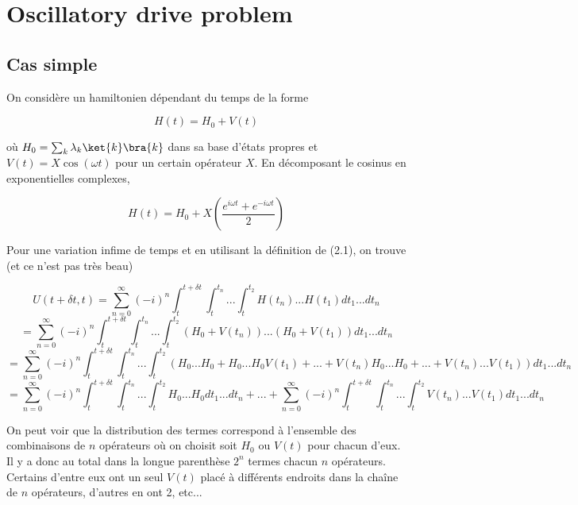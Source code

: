 \section{Oscillatory drive problem}
\subsection{Cas simple}
On considère un hamiltonien dépendant du temps de la forme 

\begin{equation}
    H(t) = H_0 + V(t)
\end{equation}

où $H_0 = \sum_{k} \lambda_k \ket{k}\bra{k}$ dans sa base d'états propres et $V(t) = X\cos(\omega t)$ pour un certain opérateur $X$. En décomposant le cosinus en exponentielles complexes, 

\begin{equation*}
    H(t) = H_0 + X\left(\frac{e^{i \omega t} + e^{-i\omega t}}{2}\right)
\end{equation*}

Pour une variation infime de temps et en utilisant la définition de (2.1), on trouve (et ce n'est pas très beau)

\begin{equation*}
    U(t+\delta t, t) = \sum_{n=0}^{\infty} (-i)^n \int_{t}^{t+\delta t}\int_{t}^{t_n}...\int_{t}^{t_2}H(t_n)...H(t_1)dt_1 ... dt_n
\end{equation*}
\begin{equation*}
    = \sum_{n=0}^{\infty} (-i)^n \int_{t}^{t+\delta t}\int_{t}^{t_n}...\int_{t}^{t_2}\left(H_0 + 
    V(t_n)\right)...\left(H_0 + V(t_1)\right)dt_1 ... dt_n
\end{equation*}
\begin{equation*}
    = \sum_{n=0}^{\infty} (-i)^n \int_{t}^{t+\delta t}\int_{t}^{t_n}...\int_{t}^{t_2} \left(H_0...H_0 + H_0...H_0V(t_1) + ... + V(t_n)H_0...H_0 + ... + V(t_n)...V(t_1)\right)dt_1 ... dt_n
\end{equation*}
\begin{equation}
    = \sum_{n=0}^{\infty} (-i)^n \int_{t}^{t+\delta t}\int_{t}^{t_n}...\int_{t}^{t_2} H_0...H_0 dt_1...dt_n + ... + \sum_{n=0}^{\infty} (-i)^n \int_{t}^{t+\delta t}\int_{t}^{t_n}...\int_{t}^{t_2} V(t_n)...V(t_1) dt_1...dt_n
\end{equation}

On peut voir que la distribution des termes correspond à l'ensemble des combinaisons de $n$ opérateurs où on choisit soit $H_0$ ou $V(t)$ pour chacun d'eux. Il y a donc au total dans la longue parenthèse $2^n$ termes chacun $n$ opérateurs. Certains d'entre eux ont un seul $V(t)$ placé à différents endroits dans la chaîne de $n$ opérateurs, d'autres en ont 2, etc... 

